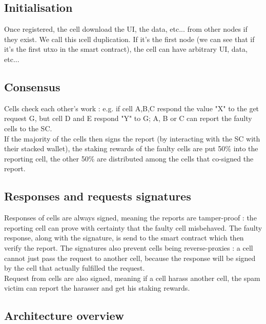 \documentclass{paper}
\begin{document}
\subsection{Initialisation}
Once registered, the cell download the UI, the data, etc... from other nodes if they exist. We call this \i{cell duplication}. If it's the first node (we can see that if it's the first utxo in the smart contract), the cell can have arbitrary UI, data, etc...

\subsection{Consensus}
Cells check each other's work : e.g. if cell A,B,C respond the value "X" to the get request G, but cell D and E respond "Y" to G; A, B or C can report the faulty cells to the SC.
\\
If the majority of the cells then signs the report (by interacting with the SC with their stacked wallet), the staking rewards of the faulty cells are put 50\% into the reporting cell, the other 50\% are distributed among the cells that co-signed the report.

\subsection{Responses and requests signatures}
Responses of cells are always signed, meaning the reports are tamper-proof : the reporting cell can prove with certainty that the faulty cell misbehaved. The faulty response, along with the signature, is send to the smart contract which then verify the report. The signatures also prevent cells  being reverse-proxies : a cell cannot just pass the request to another cell, because the response will be signed by the cell that actually fulfilled the request.
\\

Request from cells are also signed, meaning if a cell harass another cell, the spam victim can report the harasser and get his staking rewards.

\subsection{Architecture overview}
\end{document}

